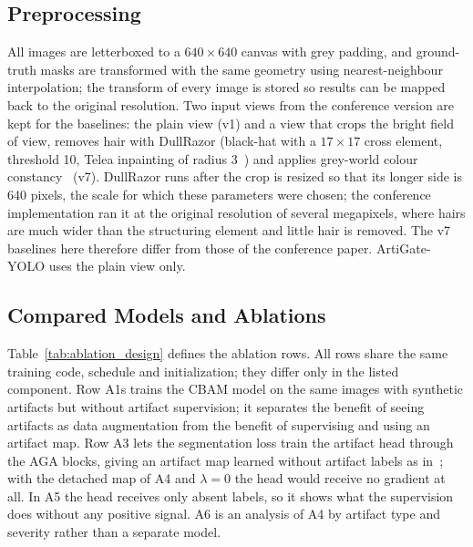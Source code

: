 \subsection{Preprocessing}
All images are letterboxed to a $640\times640$ canvas with grey padding, and ground-truth masks are transformed with the same geometry using nearest-neighbour interpolation; the transform of every image is stored so results can be mapped back to the original resolution. Two input views from the conference version are kept for the baselines: the plain view (v1) and a view that crops the bright field of view, removes hair with DullRazor (black-hat with a $17\times17$ cross element, threshold 10, Telea inpainting of radius 3~\cite{lee1997dullrazor,telea2004inpainting}) and applies grey-world colour constancy~\cite{buchsbaum1980grayworld} (v7). DullRazor runs after the crop is resized so that its longer side is 640 pixels, the scale for which these parameters were chosen; the conference implementation ran it at the original resolution of several megapixels, where hairs are much wider than the structuring element and little hair is removed. The v7 baselines here therefore differ from those of the conference paper. ArtiGate-YOLO uses the plain view only.

\subsection{Compared Models and Ablations}
Table~\ref{tab:ablation_design} defines the ablation rows. All rows share the same training code, schedule and initialization; they differ only in the listed component. Row A1s trains the CBAM model on the same images with synthetic artifacts but without artifact supervision; it separates the benefit of seeing artifacts as data augmentation from the benefit of supervising and using an artifact map. Row A3 lets the segmentation loss train the artifact head through the AGA blocks, giving an artifact map learned without artifact labels as in~\cite{singh2025dualresolution,gong2026artifactaware}; with the detached map of A4 and $\lambda=0$ the head would receive no gradient at all. In A5 the head receives only absent labels, so it shows what the supervision does without any positive signal. A6 is an analysis of A4 by artifact type and severity rather than a separate model.

